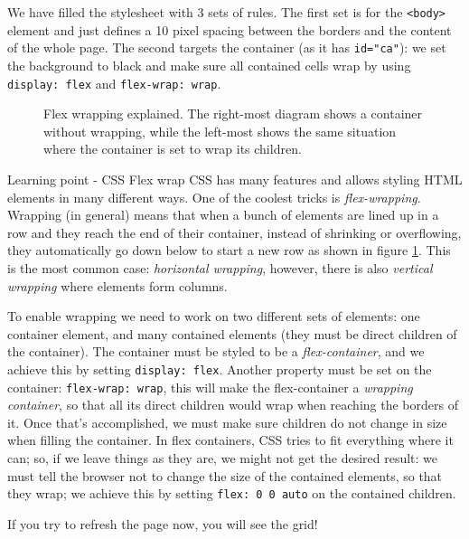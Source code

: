 We have filled the stylesheet with 3 sets of rules. The first set is for the \texttt{<body>} element
and just defines a 10 pixel spacing between the borders and the content of the whole page.
The second targets
the container (as it has \texttt{id="ca"}): we set the background to black and
make sure all contained cells wrap by using \texttt{display: flex} and \texttt{flex-wrap: wrap}.

%
\begin{figure}[b]
\sidecaption

%
%
\caption{Flex wrapping explained. The right-most diagram shows a container without wrapping,
while the left-most shows the same situation where the container is set to wrap its children.}
\label{fig:flexwrap}
\end{figure}
%

\begin{tips}{Learning point - CSS Flex wrap}
CSS has many features and allows styling HTML elements in many different ways. One of the coolest tricks
is \textit{flex-wrapping}. Wrapping (in general) means that
when a bunch of elements are lined up in a row and they reach the
end of their container, instead of shrinking or overflowing, they automatically go down below to start a
new row as shown in figure \ref{fig:flexwrap}. This is the most common case: \textit{horizontal wrapping},
however, there is also \textit{vertical wrapping} where elements form columns.

To enable wrapping we need to work on two different sets of elements: one container element, and many
contained elements (they must be direct children of the container). The container must be styled to
be a \textit{flex-container}, and we achieve this by setting \texttt{display: flex}. Another property
must be set on the container: \texttt{flex-wrap: wrap}, this will make the flex-container a
\textit{wrapping container}, so that all its direct children would wrap when reaching the borders of it.
Once that's accomplished, we must make sure children do not change in size when filling the container.
In flex containers, CSS tries to fit everything where it can; so, if we leave things as they are, we might
not get the desired result: we must tell the browser not to change the size of the contained elements, so that
they wrap; we achieve this by setting \texttt{flex: 0 0 auto} on the contained children.
\end{tips}

If you try to refresh the page now, you will see the grid!

